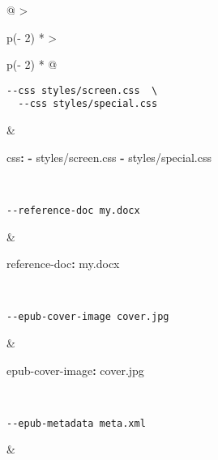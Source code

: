 \documentclass[
]{article}
\newenvironment{Shaded}{}{}
\newcommand{\AttributeTok}[1]{\textcolor[rgb]{0.49,0.56,0.16}{#1}}
\newcommand{\FunctionTok}[1]{\textcolor[rgb]{0.02,0.16,0.49}{#1}}
\newcommand{\KeywordTok}[1]{\textcolor[rgb]{0.00,0.44,0.13}{\textbf{#1}}}
\begin{document}
\begin{longtable}[]{@{}
  >{\raggedright\arraybackslash}p{(\columnwidth - 2\tabcolsep) * }
  >{\raggedright\arraybackslash}p{(\columnwidth - 2\tabcolsep) * }@{}}
\begin{minipage}[t]{\linewidth}
\begin{verbatim}
--css styles/screen.css  \
  --css styles/special.css
\end{verbatim}
\end{minipage} & \begin{minipage}[t]{\linewidth}\raggedright
\begin{Shaded}
\begin{Highlighting}[]
\FunctionTok{css}\KeywordTok{:}
\AttributeTok{  }\KeywordTok{{-}}\AttributeTok{ styles/screen.css}
\AttributeTok{  }\KeywordTok{{-}}\AttributeTok{ styles/special.css}
\end{Highlighting}
\end{Shaded}
\end{minipage} \\
\begin{minipage}[t]{\linewidth}\raggedright
\begin{verbatim}
--reference-doc my.docx
\end{verbatim}
\end{minipage} & \begin{minipage}[t]{\linewidth}\raggedright
\begin{Shaded}
\begin{Highlighting}[]
\FunctionTok{reference{-}doc}\KeywordTok{:}\AttributeTok{ my.docx}
\end{Highlighting}
\end{Shaded}
\end{minipage} \\
\begin{minipage}[t]{\linewidth}\raggedright
\begin{verbatim}
--epub-cover-image cover.jpg
\end{verbatim}
\end{minipage} & \begin{minipage}[t]{\linewidth}\raggedright
\begin{Shaded}
\begin{Highlighting}[]
\FunctionTok{epub{-}cover{-}image}\KeywordTok{:}\AttributeTok{ cover.jpg}
\end{Highlighting}
\end{Shaded}
\end{minipage} \\
\begin{minipage}[t]{\linewidth}\raggedright
\begin{verbatim}
--epub-metadata meta.xml
\end{verbatim}
\end{minipage} & \begin{minipage}[t]{\linewidth}\raggedright

\end{minipage}
\end{longtable}
\end{document}
